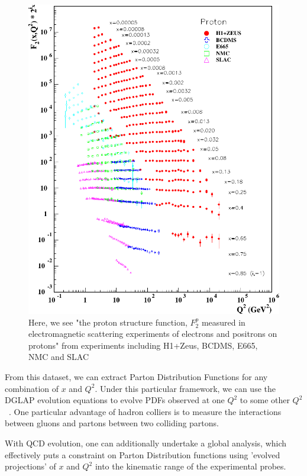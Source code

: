 \begin{figure}
  \centering
  \includegraphics[width=\linewidth]{./figures/F2_structure_function.pdf}
  \caption{
		Here, we see "the proton structure function, $F_2^p$ measured in
		electromagnetic scattering experiments of electrons and positrons on
		protons" from experiments including H1+Zeus, BCDMS, E665, NMC and
		SLAC~\cite{ReviewEidelman2012}
  }
  \label{fig:f2_world_data}
\end{figure}

From this dataset, we can extract Parton Distribution Functions for any
combination of $x$ and $Q^2$. Under this particular framework, we can use the
DGLAP evolution equations to evolve PDFs observed at one $Q^2$ to some other
$Q^2$~\cite{Altarelli2009}. One particular advantage of hadron colliers is to
measure the interactions between gluons and partons between two colliding
partons. 

With QCD evolution, one can additionally undertake a global analysis, which
effectively puts a constraint on Parton Distribution functions using 'evolved
projections' of $x$ and $Q^2$ into the kinematic range of the experimental
probes. 

